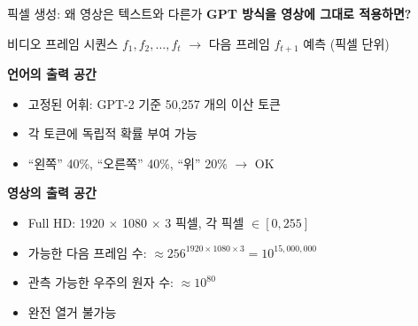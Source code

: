 \documentclass[aspectratio=169,10pt]{beamer}
\begin{document}
\begin{frame}{픽셀 생성: 왜 영상은 텍스트와 다른가}
\textbf{GPT 방식을 영상에 그대로 적용하면?}

\vspace{0.3em}
\begin{center}
비디오 프레임 시퀀스 $f_1, f_2, \ldots, f_t$ $\to$ 다음 프레임 $f_{t+1}$ 예측 (픽셀 단위)
\end{center}

\vspace{0.3em}
\textbf{언어의 출력 공간}
\begin{itemize}
  \item 고정된 어휘: GPT-2 기준 \alert{50,257} 개의 이산 토큰
  \item 각 토큰에 독립적 확률 부여 가능
  \item ``왼쪽'' 40\%, ``오른쪽'' 40\%, ``위'' 20\% $\to$ OK
\end{itemize}

\vspace{0.4em}
\textbf{영상의 출력 공간}
\begin{itemize}
  \item Full HD: 1920 $\times$ 1080 $\times$ 3 픽셀, 각 픽셀 $\in [0,255]$
  \item 가능한 다음 프레임 수: $\approx 256^{1920 \times 1080 \times 3} = 10^{15{,}000{,}000}$
  \item 관측 가능한 우주의 원자 수: $\approx 10^{80}$
  \item \alert{완전 열거 불가능}
\end{itemize}
\end{frame}
\end{document}

